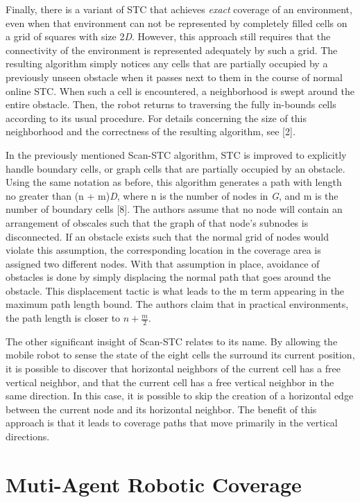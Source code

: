 \documentclass[letterpaper, 12pt, leqno]{report}
\begin{document}
Finally, there is a variant of STC that achieves \textit{exact} coverage of an environment, even when that environment can not be represented by completely filled cells on a grid of squares with size 2\textit{D}. However, this approach still requires that the connectivity of the environment is represented adequately by such a grid. The resulting algorithm simply notices any cells that are partially occupied by a previously unseen obstacle when it passes next to them in the course of normal online STC. When such a cell is encountered, a neighborhood is swept around the entire obstacle. Then, the robot returns to traversing the fully in-bounds cells according to its usual procedure. For details concerning the size of this neighborhood and the correctness of the resulting algorithm, see [2].

In the previously mentioned Scan-STC algorithm, STC is improved to explicitly handle boundary cells, or graph cells that are partially occupied by an obstacle. Using the same notation as before, this algorithm generates a path with length no greater than (n + m)\textit{D}, where n is the number of nodes in \textit{G}, and m is the number of boundary cells [8]. The authors assume that no node will contain an arrangement of obscales such that the graph of that node's subnodes is disconnected. If an obstacle exists such that the normal grid of nodes would violate this assumption, the corresponding location in the coverage area is assigned two different nodes. With that assumption in place, avoidance of obstacles is done by simply displacing the normal path that goes around the obstacle. This displacement tactic is what leads to the m term appearing in the maximum path length bound. The authors claim that in practical environments, the path length is closer to $ n + \frac{m}{2} $.

The other significant insight of Scan-STC relates to its name. By allowing the mobile robot to sense the state of the eight cells the surround its current position, it is possible to discover that horizontal neighbors of the current cell has a free vertical neighbor, and that the current cell has a free vertical neighbor in the same direction. In this case, it is possible to skip the creation of a horizontal edge between the current node and its horizontal neighbor. The benefit of this approach is that it leads to coverage paths that move primarily in the vertical directions. 

\section{Muti-Agent Robotic Coverage}
\end{document}
